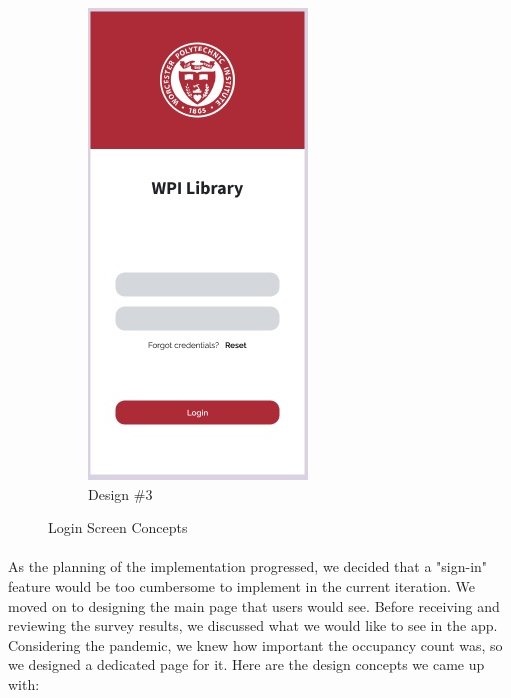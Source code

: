 \begin{figure}[H]
\begin{subfigure}{0.33\textwidth}
        \includegraphics[width=0.6\linewidth]{assets/img/login_3.jpg}
        \caption{Design \#3}
        \label{fig:login_screens_2}
    \end{subfigure}
    \caption{Login Screen Concepts}
    \label{fig:login_screens}
\end{figure}

\paragraph{}
As the planning of the implementation progressed, we decided that a "sign-in" feature would be too cumbersome to implement in the current iteration. We moved on to designing the main page that users would see. Before receiving and reviewing the survey results, we discussed what we would like to see in the app. Considering the pandemic, we knew how important the occupancy count was, so we designed a dedicated page for it. Here are the design concepts we came up with:

